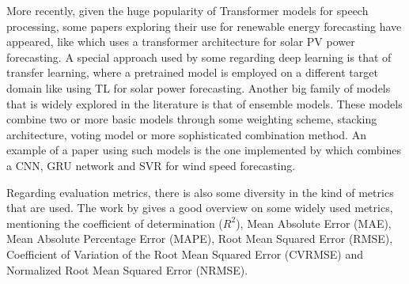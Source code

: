 More recently, given the huge popularity of Transformer models for speech processing, some papers exploring their use for renewable energy forecasting have appeared, like \cite{kim_obregon_park_jung_2024} which uses a transformer architecture for solar PV power forecasting.
A special approach used by some regarding deep learning is that of transfer learning, where a pretrained model is employed on a different target domain like \cite{mylona_doukas_2022} using TL for solar power forecasting.
Another big family of models that is widely explored in the literature is that of ensemble models. These models combine two or more basic models through some weighting scheme, stacking architecture, voting model or more sophisticated combination method. An example of a paper using such models is the one implemented by \cite{liu_mi_li_duan_xu_2019} which combines a CNN, GRU network and SVR for wind speed forecasting.

Regarding evaluation metrics, there is also some diversity in the kind of metrics that are used. The work by \cite{aristeidis_tjortjis_2024} gives a good overview on some widely used metrics, mentioning the coefficient of determination ($R^2$), Mean Absolute Error (MAE), Mean Absolute Percentage Error (MAPE), Root Mean Squared Error (RMSE), Coefficient of Variation of the Root Mean Squared Error (CVRMSE) and Normalized Root Mean Squared Error (NRMSE).
